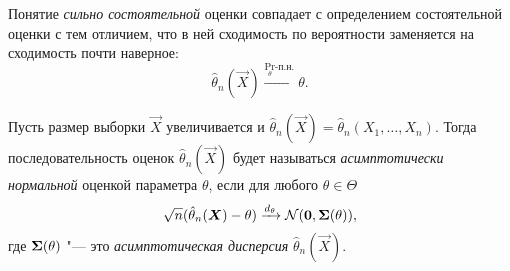 Понятие \emph{сильно состоятельной} оценки совпадает с определением состоятельной оценки с тем отличием, что в ней сходимость по вероятности заменяется на сходимость почти наверное:
\[
	\hat{\theta}_{n}(\vec{X}) \xrightarrow{\Pr_{\theta}\text{-п.н.}} \theta.
\]

\begin{definition}
	Пусть размер выборки $\vec{X}$ увеличивается и $\hat{\theta}_{n}(\vec{X}) = \hat{\theta}_{n}(X_{1}, \ldots, X_{n})$.
	Тогда последовательность оценок $\hat{\theta}_{n}(\vec{X})$ будет называться \emph{асимптотически нормальной} оценкой параметра $\theta$, если для любого $\theta \in \Theta$
	\[
		\sqrt{n}(\hat{\theta}_{n}(\bm{X}) - \theta) \xrightarrow{d_{\theta}} \mathcal{N}(\bm{0}, \mathbf{\Sigma}(\theta)),
	\]
	где $\mathbf{\Sigma}(\theta)$ "--- это \emph{асимптотическая дисперсия} $\hat{\theta}_{n}(\vec{X})$.
\end{definition}

